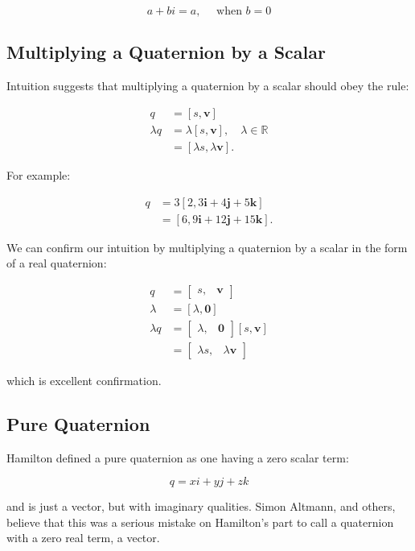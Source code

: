 \documentclass[10pt]{article}
\begin{document}
$$
a+b i=a, \quad \text { when } b=0
$$

\subsection{Multiplying a Quaternion by a Scalar}
Intuition suggests that multiplying a quaternion by a scalar should obey the rule:

$$
\begin{aligned}
q & =[s, \mathbf{v}] \\
\lambda q & =\lambda[s, \mathbf{v}], \quad \lambda \in \mathbb{R} \\
& =[\lambda s, \lambda \mathbf{v}] .
\end{aligned}
$$

For example:

$$
\begin{aligned}
q & =3[2,3 \mathbf{i}+4 \mathbf{j}+5 \mathbf{k}] \\
& =[6,9 \mathbf{i}+12 \mathbf{j}+15 \mathbf{k}] .
\end{aligned}
$$

We can confirm our intuition by multiplying a quaternion by a scalar in the form of a real quaternion:

$$
\begin{aligned}
q & =\left[\begin{array}{ll}
s, & \mathbf{v}
\end{array}\right] \\
\lambda & =[\lambda, \mathbf{0}] \\
\lambda q & =\left[\begin{array}{ll}
\lambda, & \mathbf{0}
\end{array}\right][s, \mathbf{v}] \\
& =\left[\begin{array}{ll}
\lambda s, & \lambda \mathbf{v}
\end{array}\right]
\end{aligned}
$$

which is excellent confirmation.

\subsection{Pure Quaternion}
Hamilton defined a pure quaternion as one having a zero scalar term:

$$
q=x i+y j+z k
$$

and is just a vector, but with imaginary qualities. Simon Altmann, and others, believe that this was a serious mistake on Hamilton's part to call a quaternion with a zero real term, a vector.
\end{document}

